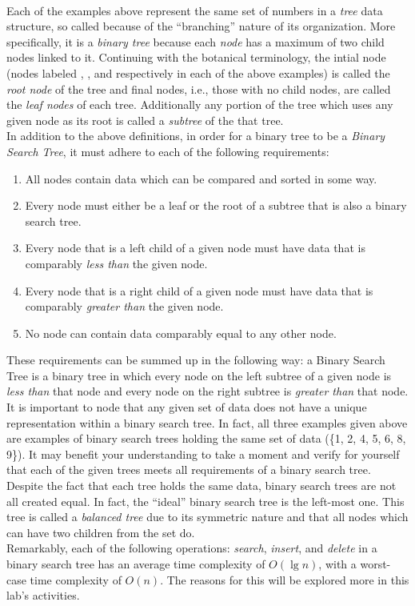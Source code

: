 		\ \\[9pt]
		Each of the examples above represent the same set of numbers in a \emph{tree} data structure, so called because of the ``branching'' nature of its organization. More specifically, it is a \emph{binary tree} because each \emph{node} has a maximum of two child nodes linked to it. Continuing with the botanical terminology, the intial node (nodes labeled , , and  respectively in each of the above examples) is called the \emph{root node} of the tree and final nodes, i.e., those with no child nodes, are called the \emph{leaf nodes} of each tree. Additionally any portion of the tree which uses any given node as its root is called a \emph{subtree} of the that tree.\\[\baselineskip]
		In addition to the above definitions, in order for a binary tree to be a \emph{Binary Search Tree}, it must adhere to each of the following requirements:
		\begin{enumerate}
			\item All nodes contain data which can be compared and sorted in some way.
			\item Every node must either be a leaf or the root of a subtree that is also a binary search tree.
			\item Every node that is a left child of a given node must have data that is comparably \emph{less than} the given node.
			\item Every node that is a right child of a given node must have data that is comparably \emph{greater than} the given node.
			\item No node can contain data comparably equal to any other node.
		\end{enumerate}
		These requirements can be summed up in the following way: a Binary Search Tree is a binary tree in which every node on the left subtree of a given node is \emph{less than} that node and every node on the right subtree is \emph{greater than} that node.\\[\baselineskip]
		It is important to node that any given set of data does not have a unique representation within a binary search tree. In fact, all three examples given above are examples of binary search trees holding the same set of data (\{1, 2, 4, 5, 6, 8, 9\}). It may benefit your understanding to take a moment and verify for yourself that each of the given trees meets all requirements of a binary search tree. Despite the fact that each tree holds the same data, binary search trees are not all created equal. In fact, the ``ideal'' binary search tree is the left-most one. This tree is called a \emph{balanced tree} due to its symmetric nature and that all nodes which can have two children from the set do.\\[\baselineskip]
		Remarkably, each of the following operations: \emph{search}, \emph{insert}, and \emph{delete} in a binary search tree has an average time complexity of $O(\lg n)$, with a worst-case time complexity of $O(n)$. The reasons for this will be explored more in this lab's activities.

